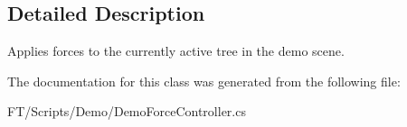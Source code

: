 \subsection{Detailed Description}
Applies forces to the currently active tree in the demo scene. 



The documentation for this class was generated from the following file\+:\begin{DoxyCompactItemize}
\item 
F\+T/\+Scripts/\+Demo/Demo\+Force\+Controller.\+cs\end{DoxyCompactItemize}
